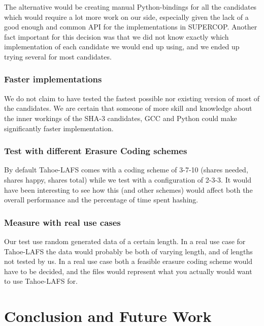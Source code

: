 \documentclass[english,12pt,a4paper]{book}
\begin{document}
The alternative would be creating manual Python-bindings for all the candidates
which would require a lot more work on our side, especially given the lack of a
good enough and common \ac{API} for the implementations in \ac{SUPERCOP}.
Another fact important for this decision was that we did not know exactly which
implementation of each candidate we would end up using, and we ended up trying
several for most candidates.

\subsection{Faster implementations}
We do not claim to have tested the fastest possible nor existing version
of most of the candidates. We are certain that someone of more skill and
knowledge about the inner workings of the \ac{SHA}-3 candidates, \ac{GCC} and
Python could make significantly faster implementation.

\subsection{Test with different Erasure Coding schemes}
By default Tahoe-\ac{LAFS} comes with a coding scheme of 3-7-10 (shares needed,
shares happy, shares total) while we test with a configuration of 2-3-3. It
would have been interesting to see how this (and other schemes) would affect
both the overall performance and the percentage of time spent hashing.

\subsection{Measure with real use cases}
Our test use random generated data of a certain length. In a real use case for
Tahoe-\ac{LAFS} the data would probably be both of varying length, and of
lengths not tested by us. In a real use case both a feasible erasure coding
scheme would have to be decided, and the files would represent what you
actually would want to use Tahoe-\ac{LAFS} for.

\chapter{Conclusion and Future Work}

\end{document}
